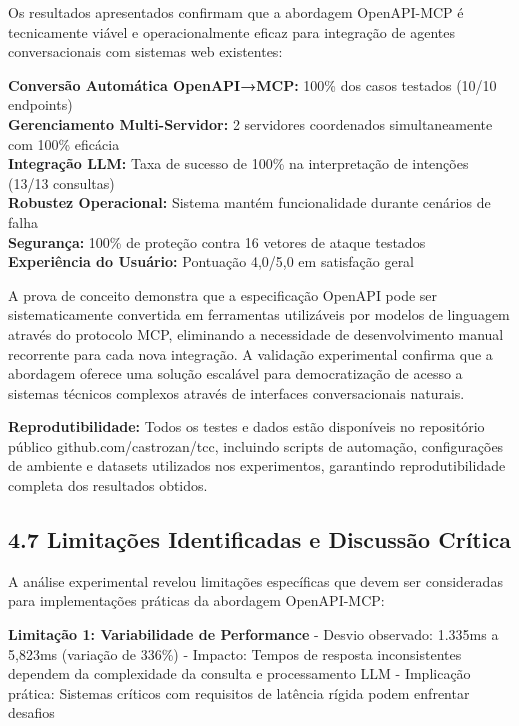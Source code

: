 \documentclass[
]{article}
\begin{document}
Os resultados apresentados confirmam que a abordagem OpenAPI-MCP é
tecnicamente viável e operacionalmente eficaz para integração de agentes
conversacionais com sistemas web existentes:

\textbf{Conversão Automática OpenAPI→MCP:} 100\% dos casos testados
(10/10 endpoints)\\
\textbf{Gerenciamento Multi-Servidor:} 2 servidores coordenados
simultaneamente com 100\% eficácia\\
\textbf{Integração LLM:} Taxa de sucesso de 100\% na interpretação de
intenções (13/13 consultas)\\
\textbf{Robustez Operacional:} Sistema mantém funcionalidade durante
cenários de falha\\
\textbf{Segurança:} 100\% de proteção contra 16 vetores de ataque
testados\\
\textbf{Experiência do Usuário:} Pontuação 4,0/5,0 em satisfação geral

A prova de conceito demonstra que a especificação OpenAPI pode ser
sistematicamente convertida em ferramentas utilizáveis por modelos de
linguagem através do protocolo MCP, eliminando a necessidade de
desenvolvimento manual recorrente para cada nova integração. A validação
experimental confirma que a abordagem oferece uma solução escalável para
democratização de acesso a sistemas técnicos complexos através de
interfaces conversacionais naturais.

\textbf{Reprodutibilidade:} Todos os testes e dados estão disponíveis no
repositório público github.com/castrozan/tcc, incluindo scripts de
automação, configurações de ambiente e datasets utilizados nos
experimentos, garantindo reprodutibilidade completa dos resultados
obtidos.

\subsection{4.7 Limitações Identificadas e Discussão
Crítica}\label{limitauxe7uxf5es-identificadas-e-discussuxe3o-cruxedtica}

A análise experimental revelou limitações específicas que devem ser
consideradas para implementações práticas da abordagem OpenAPI-MCP:

\textbf{Limitação 1: Variabilidade de Performance} - Desvio observado:
1.335ms a 5,823ms (variação de 336\%) - Impacto: Tempos de resposta
inconsistentes dependem da complexidade da consulta e processamento LLM
- Implicação prática: Sistemas críticos com requisitos de latência
rígida podem enfrentar desafios
\end{document}
